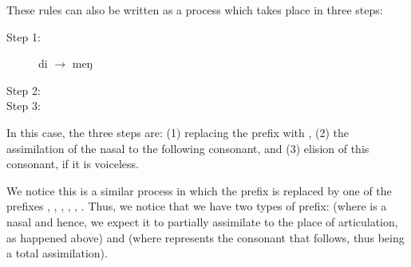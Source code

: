 \begin{refsection}
\begin{mysolution}
\begin{solutions}
\begin{sloppypar}
These rules can also be written as a process which takes place in three steps:
\end{sloppypar}
 
\begin{description}
    \item[Step 1:]   di $\to$ meŋ %
    \item[Step 2:]


\item[Step 3:]


\end{description}

In this case, the three steps are: (1) replacing the prefix  with , (2) the assimilation of the nasal  to the following consonant, and (3) elision of this consonant, if it is
voiceless.

\item We notice this is a similar process in which the prefix  is replaced by one of the prefixes , , , , , . Thus, we notice that we have two types of prefix:  (where  is a nasal and hence, we expect it to partially assimilate to the place of articulation, as happened above) and  (where  represents the consonant that follows, thus being a total assimilation).


\end{solutions}
\end{mysolution}
\end{refsection}
